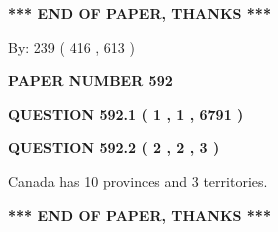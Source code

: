 \documentclass[12pt]{article}
\begin{document}
 
 
 
   
   
 \vspace{0.2in}
 
   
   
   
   
\vspace{1.0in} 
{\textbf{\large{ *** END OF PAPER, THANKS *** }}} 
   
   
\hspace{1.0in} By: 
 239 ( 416 ,  613 )
   
   
   
   
\newpage 
\setcounter{page}{ 
   592001 } 
   
   
   
   
 {\textbf{ \Large{ PAPER NUMBER  592  }}}
   
   
\vspace{0.2in}
   
   
   
   
   
   
 \vspace{0.2in}
 
 
 
 
   
   
  
\vspace{0.2in}
  
{\textbf{\Large{QUESTION
592.1 
 ( 1 , 1 , 6791 )
}}}
  
  
  
\vspace{0.2in}
  
{\textbf{\Large{QUESTION
592.2 
 ( 2 , 2 , 3 )
}}}
  
  
 
 
\noindent{}
 
 
Canada has 10  provinces and 3 territories.
 
 
 
 
   
   
 \vspace{0.2in}
 
   
   
   
   
\vspace{1.0in} 
{\textbf{\large{ *** END OF PAPER, THANKS *** }}} 
   
\end{document}
